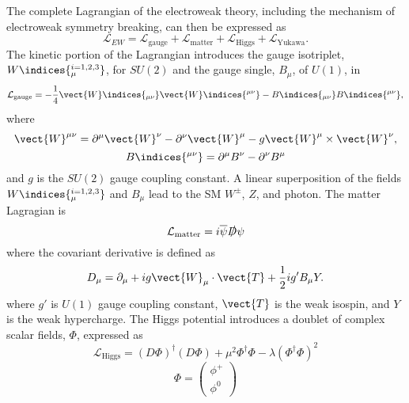 The complete Lagrangian of the electroweak theory, including the mechanism 
of electroweak symmetry breaking, can then be expressed as
\begin{equation}
\mathcal{L}_{EW} = \mathcal{L}_\text{gauge} + \mathcal{L}_\text{matter} + \mathcal{L}_\text{Higgs} +   \mathcal{L}_\text{Yukawa}  .
\end{equation}
The kinetic portion of the Lagrangian introduces the gauge isotriplet, $W\indices{_{\mu}^{i=1,2,3}}$, for 
 $ SU\left(2\right) $ and the gauge single, $B_\mu$, of $ U\left(1\right) $, in
\begin{equation}
\mathcal{L}_\text{gauge} =  -\frac{1}{4} \vect{W}\indices{_{\mu\nu}}\vect{W}\indices{^{\mu\nu}} - B\indices{_{\mu\nu}}B\indices{^{\mu\nu}},
\end{equation}
where 
\begin{equation}
\vect{W}^{\mu\nu} = \partial^{\mu}\vect{W}^{\nu} - \partial^{\nu} \vect{W}^{\mu} - g \vect{W}^{\mu} \times \vect{W}^{\nu},
\end{equation}
\begin{equation}
B\indices{^{\mu\nu}} = \partial^{\mu} B^{\nu} - \partial^{\nu} B^{\mu}
\end{equation}
and $g$ is the $ SU\left(2\right) $ gauge coupling constant. A linear superposition of the 
fields  $W\indices{_{\mu}^{i=1,2,3}}$ and $B_\mu$ lead to the SM $W^{\pm}$, $Z$, and photon.
The matter Lagragian is
\begin{equation}
\mathcal{L}_\text{matter} = i\overline{\psi}\slashed{D}\psi
\end{equation}
where the covariant derivative is defined as
\begin{equation}
D_{\mu} = \partial_\mu + i g \vect{W}_\mu \cdot \vect{T} + \frac{1}{2}i g' B_{\mu}Y.
\end{equation}
where $g'$ is  $ U\left(1\right) $ gauge coupling constant, $\vect{T}$ is the weak isospin, and $Y$ is the weak hypercharge.
The Higgs potential introduces a doublet of complex scalar fields, $\Phi$, expressed as
\begin{equation}
 \mathcal{L}_\text{Higgs} = \left(D\Phi\right)^{\dagger} \left(D\Phi\right) + \mu^2 \Phi^{\dagger} \Phi - \lambda  \left(\Phi^{\dagger} \Phi \right)^2
\end{equation}
\begin{equation}
\Phi = \left( \begin{matrix} \phi^+ \\ \phi^0\end{matrix} \right)
\end{equation}
